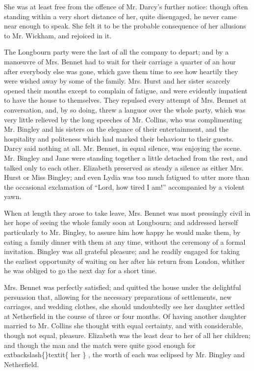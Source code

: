 \documentclass[10pt]{book}
\begin{document}
   She was at least free from the offence of Mr. Darcy’s further notice:
though often standing within a very short distance of her, quite
disengaged, he never came near enough to speak. She felt it to be the
probable consequence of her allusions to Mr. Wickham, and rejoiced in
it.
  

   The Longbourn party were the last of all the company to depart; and by a
manœuvre of Mrs. Bennet had to wait for their carriage a quarter of an
hour after everybody else was gone, which gave them time to see how
heartily they were wished away by some of the family. Mrs. Hurst and her
sister scarcely opened their mouths except to complain of fatigue, and
were evidently impatient to have the house to themselves. They repulsed
every attempt of Mrs. Bennet at conversation, and, by so doing, threw a
languor over the whole party, which was very little relieved by the long
speeches of Mr. Collins, who was complimenting Mr. Bingley and his
sisters on the elegance of their entertainment, and the hospitality and
politeness which had marked their behaviour to their guests. Darcy said
nothing at all. Mr. Bennet, in equal silence, was enjoying the scene.
Mr. Bingley and Jane were standing together a little detached from the
rest, and talked only to each other. Elizabeth preserved as steady a
silence as either Mrs. Hurst or Miss Bingley; and even Lydia was too
much fatigued to utter more than the occasional exclamation of “Lord,
how tired I am!” accompanied by a violent yawn.
  

   When at length they arose to take leave, Mrs. Bennet was most pressingly
civil in her hope of seeing the whole family soon at Longbourn; and
addressed herself particularly to Mr. Bingley, to assure him how happy
he would make them, by eating a family dinner with them at any time,
without the ceremony of a formal invitation. Bingley was all grateful
pleasure; and he readily engaged for taking the earliest opportunity of
waiting on her after his return from London, whither he was obliged to
go the next day for a short time.
  

   Mrs. Bennet was perfectly satisfied; and quitted the house under the
delightful persuasion that, allowing for the necessary preparations of
settlements, new carriages, and wedding clothes, she should undoubtedly
see her daughter settled at Netherfield in the course of three or four
months. Of having another daughter married to Mr. Collins she thought
with equal certainty, and with considerable, though not equal, pleasure.
Elizabeth was the least dear to her of all her children; and though the
man and the match were quite good enough for
   	extbackslash\{\}textit\{
    her
   \}
   , the worth of each
was eclipsed by Mr. Bingley and Netherfield.
  
\end{document}
